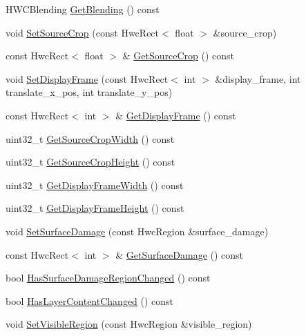 \begin{DoxyCompactItemize}
\item 
H\+W\+C\+Blending \mbox{\hyperlink{structhwcomposer_1_1HwcLayer_abbe3b975bb12172acb20688b734b9b35}{Get\+Blending}} () const
\item 
void \mbox{\hyperlink{structhwcomposer_1_1HwcLayer_a83bafbef5b9c98ad5821acdeddd9a26e}{Set\+Source\+Crop}} (const Hwc\+Rect$<$ float $>$ \&source\+\_\+crop)
\item 
const Hwc\+Rect$<$ float $>$ \& \mbox{\hyperlink{structhwcomposer_1_1HwcLayer_a354a0a0e70a92dc2f0b2f13aacba99d6}{Get\+Source\+Crop}} () const
\item 
void \mbox{\hyperlink{structhwcomposer_1_1HwcLayer_a0bf1d6ab9b9d45a7e118567b493dd346}{Set\+Display\+Frame}} (const Hwc\+Rect$<$ int $>$ \&display\+\_\+frame, int translate\+\_\+x\+\_\+pos, int translate\+\_\+y\+\_\+pos)
\item 
const Hwc\+Rect$<$ int $>$ \& \mbox{\hyperlink{structhwcomposer_1_1HwcLayer_af16f9a9bd3043eb237a4cf4f46846e66}{Get\+Display\+Frame}} () const
\item 
uint32\+\_\+t \mbox{\hyperlink{structhwcomposer_1_1HwcLayer_af844642f16862bedc2617030a87f7ab4}{Get\+Source\+Crop\+Width}} () const
\item 
uint32\+\_\+t \mbox{\hyperlink{structhwcomposer_1_1HwcLayer_af6a9eb3cc6b6c2eec606b3646d40e183}{Get\+Source\+Crop\+Height}} () const
\item 
uint32\+\_\+t \mbox{\hyperlink{structhwcomposer_1_1HwcLayer_acc6d5b593c0fda37daa52928f8491cc4}{Get\+Display\+Frame\+Width}} () const
\item 
uint32\+\_\+t \mbox{\hyperlink{structhwcomposer_1_1HwcLayer_a60e360a2299f130894b65fa1515d4746}{Get\+Display\+Frame\+Height}} () const
\item 
void \mbox{\hyperlink{structhwcomposer_1_1HwcLayer_a25ec3931c5bb7108c4b8c39c839b26dc}{Set\+Surface\+Damage}} (const Hwc\+Region \&surface\+\_\+damage)
\item 
const Hwc\+Rect$<$ int $>$ \& \mbox{\hyperlink{structhwcomposer_1_1HwcLayer_ada1b7ecdb1a62513e4c985deccb60cd7}{Get\+Surface\+Damage}} () const
\item 
bool \mbox{\hyperlink{structhwcomposer_1_1HwcLayer_afdc82d35f4385b0f3caa3541aa8abedb}{Has\+Surface\+Damage\+Region\+Changed}} () const
\item 
bool \mbox{\hyperlink{structhwcomposer_1_1HwcLayer_a1cb06b2874c743a6dce634b037a49794}{Has\+Layer\+Content\+Changed}} () const
\item 
void \mbox{\hyperlink{structhwcomposer_1_1HwcLayer_a27744cfd952d0648168a1d28c65ff092}{Set\+Visible\+Region}} (const Hwc\+Region \&visible\+\_\+region)

\end{DoxyCompactItemize}
